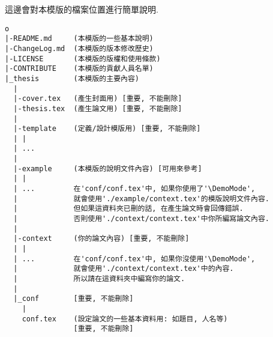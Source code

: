 
這邊會對本模版的檔案位置進行簡單說明.\\

\begin{DescriptionFrame}
\begin{verbatim}
o
|-README.md     (本模版的一些基本說明)
|-ChangeLog.md  (本模版的版本修改歷史)
|-LICENSE       (本模版的版權和使用條款)
|-CONTRIBUTE    (本模版的貢獻人員名單)
|_thesis        (本模版的主要內容)
  |
  |-cover.tex   (產生封面用) [重要, 不能刪除]
  |-thesis.tex  (產生論文用) [重要, 不能刪除]
  |
  |-template    (定義/設計模版用) [重要, 不能刪除]
  | |
  | ...
  |
  |-example     (本模版的說明文件內容) [可用來參考]
  | |
  | ...         在'conf/conf.tex'中, 如果你使用了'\DemoMode',
  |             就會使用'./example/context.tex'的模版說明文件內容.
  |             但如果這資料夾已刪的話, 在產生論文時會回傳錯誤.
  |             否則使用'./context/context.tex'中你所編寫論文內容.
  |
  |-context     (你的論文內容) [重要, 不能刪除]
  | |
  | ...         在'conf/conf.tex'中, 如果你沒使用'\DemoMode',
  |             就會使用'./context/context.tex'中的內容.
  |             所以請在這資料夾中編寫你的論文.
  |
  |_conf        [重要, 不能刪除]
    |
    conf.tex    (設定論文的一些基本資料用: 如題目, 人名等)
                [重要, 不能刪除]
\end{verbatim}
\end{DescriptionFrame}
